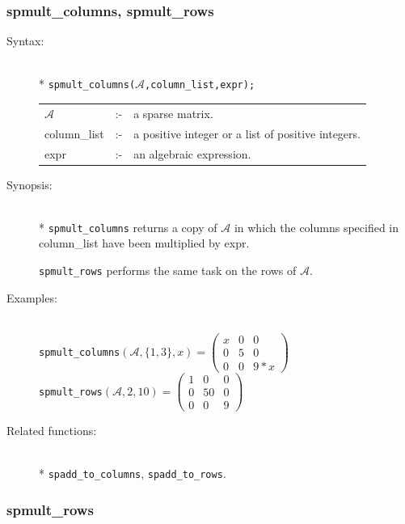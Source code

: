 \subsubsection{spmult\_columns, spmult\_rows}
\label{sparse:spmult_columns}
\hypertarget{operator:SPMULT_COLUMNS}{}

\begin{description}
\item[Syntax:]\mbox{}\\*
{\tt spmult\_columns($\mathcal{A}$,column\_list,expr);}\\[2mm]
\begin{tabular}{l l l}
$\mathcal{A}$   &:-& a sparse matrix. \\
column\_list &:-& a positive integer or a list of positive integers. \\
expr        &:-& an algebraic expression.
\end{tabular}

\item[Synopsis:]\mbox{}\\*
\texttt{spmult\_columns} returns a copy of $\mathcal{A}$ in which
                the columns specified in column\_list have been
multiplied by expr.

\texttt{spmult\_rows} performs the same task on the rows of $\mathcal{A}$.

\item[Examples:]\mbox{}\\
\texttt{spmult\_columns}\((\mathcal{A},\{1,3\},x) =
        \begin{pmatrix} x & 0 & 0 \\ 0 & 5 & 0 \\ 0 & 0 & 9*x \end{pmatrix}\) \\[2mm]
\texttt{spmult\_rows}\((\mathcal{A},2,10)  =
        \begin{pmatrix} 1 & 0 & 0 \\ 0 & 50 & 0 \\ 0 & 0 & 9 \end{pmatrix}\)

\item[Related functions:]\mbox{}\\*
\texttt{spadd\_to\_columns}, \texttt{spadd\_to\_rows}.
\end{description}

\subsubsection{spmult\_rows}
\label{sparse:spmult_rows}
\hypertarget{operator:SPMULT_ROWS}{}

